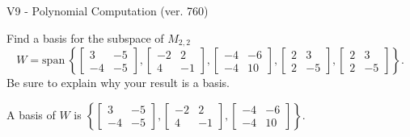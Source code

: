 \begin{exercise}
  \begin{exerciseTitle}V9 - Polynomial Computation (ver. 760)\end{exerciseTitle}
  \begin{exerciseStatement}
    Find a basis for the subspace of \(M_{2,2}\) 
\[W=\mathrm{span}\ \left\{\left[\begin{array}{cc}
3 & -5 \\
-4 & -5
\end{array}\right] , \left[\begin{array}{cc}
-2 & 2 \\
4 & -1
\end{array}\right] , \left[\begin{array}{cc}
-4 & -6 \\
-4 & 10
\end{array}\right] , \left[\begin{array}{cc}
2 & 3 \\
2 & -5
\end{array}\right] , \left[\begin{array}{cc}
2 & 3 \\
2 & -5
\end{array}\right]\right\}.\]
 Be sure to explain why your result is a basis.


  \end{exerciseStatement}
  \begin{exerciseAnswer}
   A basis of \(W\) is  \(\left\{\left[\begin{array}{cc}
3 & -5 \\
-4 & -5
\end{array}\right] , \left[\begin{array}{cc}
-2 & 2 \\
4 & -1
\end{array}\right] , \left[\begin{array}{cc}
-4 & -6 \\
-4 & 10
\end{array}\right]\right\}\).
  


  \end{exerciseAnswer}
\end{exercise}